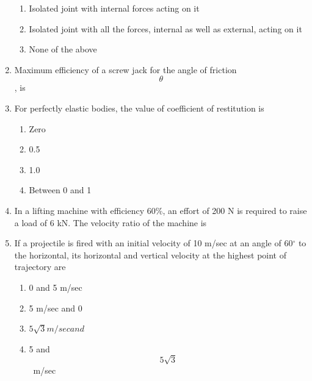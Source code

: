 \documentclass[11pt,a4paper]{article}
\begin{document}
\begin{enumerate}
\begin{enumerate}[label=\Alph*.]
\item{Isolated joint with internal forces acting on it}
\item{Isolated joint with all the forces, internal as well as external, acting on it}
\item{None of the above}
\end{enumerate}
\item{Maximum efficiency of a screw jack for the angle of friction $$\theta $$, is
}
\\
\item{For perfectly elastic bodies, the value of coefficient of restitution is}
\begin{enumerate}[label=\Alph*.]
\item{Zero}
\item{0.5}
\item{1.0}
\item{Between 0 and 1}
\end{enumerate}
\item{In a lifting machine with efficiency 60\%, an effort of 200 N is required to raise a load of 6 kN. The velocity ratio of the machine is}
\\
\item{If a projectile is fired with an initial velocity of 10 m/sec at an angle of 60$^\circ$ to the horizontal, its horizontal and vertical velocity at the highest point of trajectory are
}
\begin{enumerate}[label=\Alph*.]
\item{0 and 5 m/sec}
\item{5 m/sec and 0}
\item{$ 5\sqrt 3 $$  m/sec and $}
\item{5 and $$5\sqrt 3 $$ ~m/sec}

\end{enumerate}
\end{enumerate}
\end{document}
